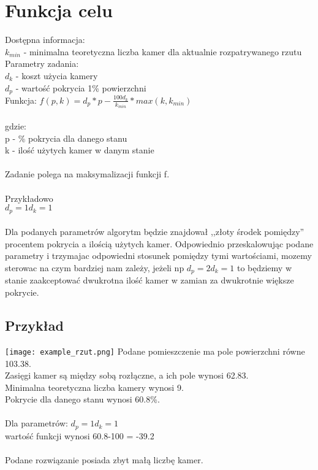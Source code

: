 \documentclass[12pt,a4paper]{article}
\begin{document}
\section{Funkcja celu}
Dostępna informacja: \\
\footnotesize
$k_{min}$ - minimalna teoretyczna liczba kamer dla aktualnie rozpatrywanego rzutu \\
\normalsize
%
\newline
Parametry zadania: \\
$d_k$ - koszt użycia kamery \\
$d_p$ - wartość pokrycia 1\% powierzchni\\
\newline
Funkcja:
$f(p, k) = d_p*p - \frac{100d_k}{k_{min}}*max(k,k_{min}) $ \\ \\
gdzie: \\
p - \% pokrycia dla danego stanu \\
k - ilość użytych kamer w danym stanie \\ \\
Zadanie polega na maksymalizacji funkcji f. \\ \\ 
Przykładowo \\
$ d_p = 1 d_k = 1$ \\ \\ 
Dla podanych parametrów algorytm będzie znajdował ,,złoty środek pomiędzy'' 
procentem pokrycia a ilością użytych kamer.
Odpowiednio przeskalowując podane parametry i trzymajac odpowiedni 
stosunek pomiędzy tymi wartościami,
mozemy sterowac na czym bardziej nam zależy, jeżeli np 
$d_p = 2d_k = 1 $ to będziemy w stanie zaakceptować dwukrotna 
ilość kamer w zamian za dwukrotnie większe pokrycie.
%
\subsection{Przykład}
\texttt{[image: example\_rzut.png]}
Podane pomieszczenie ma pole powierzchni równe 103.38. \\
Zasięgi kamer są między sobą rozłączne, a ich pole wynosi 62.83. \\
Minimalna teoretyczna liczba kamery wynosi 9. \\
Pokrycie dla danego stanu wynosi 60.8\%. \\ \\
Dla parametrów:
$d_p = 1 d_k = 1$ \\
wartość funkcji wynosi 60.8-100 = -39.2 \\ \\
Podane rozwiązanie posiada zbyt małą liczbę kamer.
\end{document}
